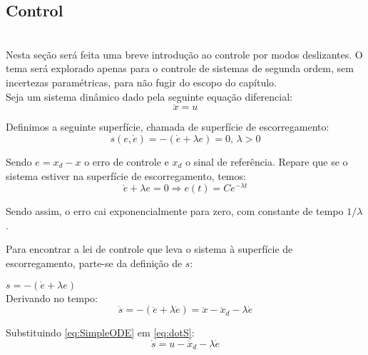 \subsection{Control}\label{S03-2}
 
\\

Nesta se\c{c}\~ao ser\'a feita uma breve introdu\c{c}\~ao ao controle por modos deslizantes. O tema ser\'a explorado apenas para o controle de sistemas de segunda ordem, sem incertezas param\'etricas, para n\~ao fugir do escopo do cap\'itulo. \\

Seja um sistema din\^amico dado pela seguinte equa\c{c}\~ao diferencial:
\begin{equation} \label{eq:SimpleODE}
\ddot{x} = u
\end{equation}

Definimos a seguinte superf\'icie, chamada de superf\'icie de escorregamento:
\begin{equation} \label{eq:SlidingSurface}
s(e, \dot{e}) = - (\dot{e} + \lambda e) = 0, \, \lambda > 0
\end{equation}

Sendo $e = x_d - x$ o erro de controle e $x_d$ o sinal de refer\^encia. Repare que se o sistema estiver na superf\'icie de escorregamento, temos:
\begin{equation} \label{eq:SlidingError}
\dot{e} + \lambda e = 0 \Rightarrow e(t) = C e^{- \lambda t}
\end{equation}

Sendo assim, o erro cai exponencialmente para zero, com constante de tempo $1/\lambda$.

Para encontrar a lei de controle que leva o sistema \`a superf\'icie de escorregamento, parte-se da defini\c{c}\~ao de $s$:

$ s = -(\dot{e} + \lambda e) $ \\

Derivando no tempo:
\begin{equation} \label{eq:dotS}
\dot{s} =  -(\ddot{e} + \lambda \dot{e}) = \ddot{x} - \ddot{x}_d - \lambda \dot{e} 
\end{equation}

Substituindo \eqref{eq:SimpleODE} em \eqref{eq:dotS}:
\begin{equation} \label{dotS2}
\dot{s} = u - \ddot{x}_d - \lambda \dot{e}
\end{equation}


